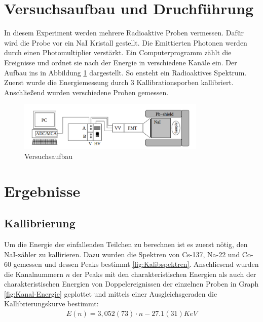 \documentclass[11pt, a4paper]{article}
\begin{document}
    \section{Versuchsaufbau und Druchführung}

    In diesem Experiment werden mehrere Radioaktive Proben vermessen. Dafür wird die Probe vor ein NaI Kristall gestellt. Die Emittierten Photonen werden durch einen Photomultiplier verstärkt. Ein Computerprogramm zählt die Ereignisse und ordnet sie nach der Energie in verschiedene Kanäle ein. Der Aufbau ins in Abbildung \ref{fig:aufbau} dargestellt. So ensteht ein Radioaktives Spektrum. Zuerst wurde die Energiemessung durch 3 Kallibrationsporben kallibriert. Anschließend wurden verschiedene Proben gemessen.
    
    \begin{figure}
        \centering
        \includegraphics[width=0.8\textwidth]{Screenshot 2023-03-14 5.37.15 PM.png}
        \caption{Versuchsaufbau}
        \label{fig:aufbau}
    \end{figure}

    \section{Ergebnisse}
    \subsection{Kallibrierung}
    Um die Energie der einfallenden Teilchen zu berechnen ist es zuerst nötig, den NaI-zähler zu kallirieren. Dazu wurden die Spektren von Cs-137, Na-22 und Co-60 gemessen und dessen Peaks bestimmt \ref{fig:Kalibspektren}. 
    Anschliesend wurden die Kanalnummern $n$ der Peaks mit den charakteristischen Energien als auch der charakteristischen Energien von Doppelereignissen der einzelnen Proben in Graph \ref{fig:Kanal-Energie} geplottet und mittels einer Ausgleichsgeraden die Kallibrierungskurve bestimmt:
    \begin{align}
        E(n) = 3,052(73) \cdot n - 27.1(31) KeV
    \end{align}
    
\end{document}
